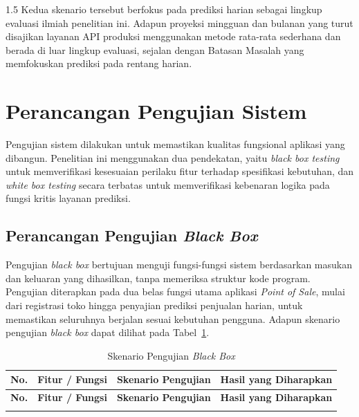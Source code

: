 \documentclass[12pt, a4paper, onecolumn, oneside]{report}
\begin{document}
\begin{spacing}{1.5}
Kedua skenario tersebut berfokus pada prediksi harian sebagai lingkup evaluasi ilmiah penelitian ini. Adapun proyeksi mingguan dan bulanan yang turut disajikan layanan API produksi menggunakan metode rata-rata sederhana dan berada di luar lingkup evaluasi, sejalan dengan Batasan Masalah yang memfokuskan prediksi pada rentang harian.
\section{Perancangan Pengujian Sistem}

Pengujian sistem dilakukan untuk memastikan kualitas fungsional aplikasi yang dibangun. Penelitian ini menggunakan dua pendekatan, yaitu \textit{black box testing} untuk memverifikasi kesesuaian perilaku fitur terhadap spesifikasi kebutuhan, dan \textit{white box testing} secara terbatas untuk memverifikasi kebenaran logika pada fungsi kritis layanan prediksi.

\subsection{Perancangan Pengujian \textit{Black Box}}

Pengujian \textit{black box} bertujuan menguji fungsi-fungsi sistem berdasarkan masukan dan keluaran yang dihasilkan, tanpa memeriksa struktur kode program. Pengujian diterapkan pada dua belas fungsi utama aplikasi \textit{Point of Sale}, mulai dari registrasi toko hingga penyajian prediksi penjualan harian, untuk memastikan seluruhnya berjalan sesuai kebutuhan pengguna. Adapun skenario pengujian \textit{black box} dapat dilihat pada Tabel~\ref{tab:blackbox}.

{
\begin{longtable}{|>{\centering\arraybackslash}p{0.6cm}|>{\raggedright\arraybackslash}p{3.0cm}|>{\raggedright\arraybackslash}p{4.7cm}|>{\raggedright\arraybackslash}p{4.7cm}|}
\caption{Skenario Pengujian \textit{Black Box}} \label{tab:blackbox} \\
\hline
\textbf{No.} & \textbf{Fitur / Fungsi} & \textbf{Skenario Pengujian} & \textbf{Hasil yang Diharapkan} \\
\hline
\endfirsthead

\hline
\textbf{No.} & \textbf{Fitur / Fungsi} & \textbf{Skenario Pengujian} & \textbf{Hasil yang Diharapkan} \\
\hline
\endhead

\hline
\endfoot
\hline
\endlastfoot


\end{longtable}}
\end{spacing}
\end{document}
